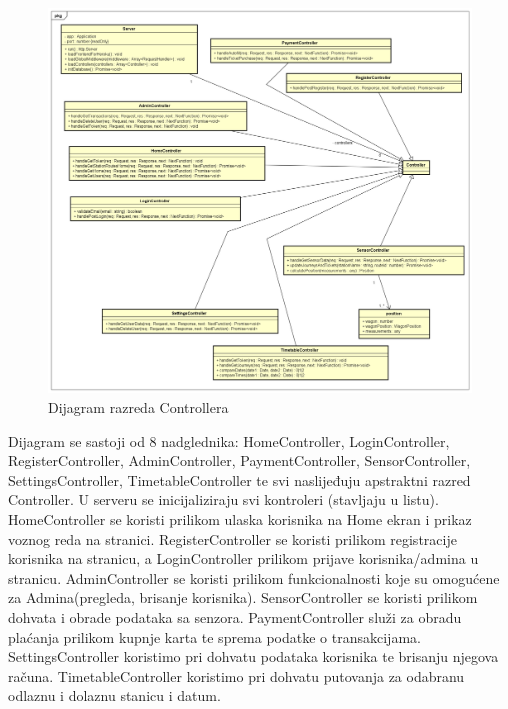 				\begin{figure}[H]
					\centering
					\includegraphics[width=1\linewidth]{"slike/ControllerClassDiagram"}
					\caption{Dijagram razreda Controllera}
					\label{fig:dijagram-controller}
				\end{figure}
				{Dijagram se sastoji od 8 nadglednika: HomeController, LoginController, RegisterController, AdminController, PaymentController, SensorController, SettingsController, TimetableController te svi naslijeđuju apstraktni razred Controller. U serveru se inicijaliziraju svi kontroleri (stavljaju u listu). HomeController se koristi prilikom ulaska korisnika na Home ekran i prikaz voznog reda na stranici. RegisterController se koristi prilikom registracije korisnika na stranicu, a LoginController prilikom prijave korisnika/admina u stranicu. AdminController se koristi prilikom funkcionalnosti koje su omogućene za Admina(pregleda, brisanje korisnika).	SensorController se koristi prilikom dohvata i obrade podataka sa senzora. PaymentController služi za obradu plaćanja prilikom kupnje karta te sprema podatke o transakcijama. SettingsController koristimo pri dohvatu podataka korisnika te brisanju njegova računa. TimetableController koristimo pri dohvatu putovanja za odabranu odlaznu i dolaznu stanicu i datum.	}
			
			\eject

